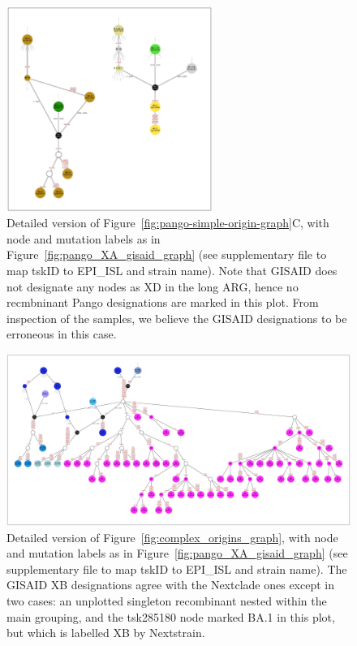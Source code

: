 \documentclass{article}
\begin{document}
\begin{figure} \centering
\includegraphics[width=0.6\textwidth]{figures/Pango_XD_gisaid_large_graph.pdf}
\caption{\label{fig:pango_XD_gisaid_graph}
Detailed version of Figure~\ref{fig:pango-simple-origin-graph}C, with node and mutation labels as in
Figure~\ref{fig:pango_XA_gisaid_graph} (see supplementary file \protect{}
to map tskID to EPI\_ISL and strain name).
Note that GISAID does not designate any nodes as XD in the long ARG, hence no recmbninant Pango designations
are marked in this plot. From inspection of the samples, we believe the GISAID designations to be erroneous
in this case.
}
\end{figure}

\begin{figure} \centering
\includegraphics[width=\textwidth]{figures/Pango_XB_gisaid_large_graph.pdf}
\caption{\label{fig:pango_XB_gisaid_graph}
Detailed version of Figure~\ref{fig:complex_origins_graph}, with node and mutation labels as in
Figure~\ref{fig:pango_XA_gisaid_graph} (see supplementary file \protect{}
to map tskID to EPI\_ISL and strain name).
The GISAID XB designations agree with the Nextclade ones except in two cases: an unplotted
singleton recombinant nested within the main grouping, and the tsk285180 node marked BA.1 in this plot,
but which is labelled XB by Nextstrain.
}
\end{figure}

\end{document}
